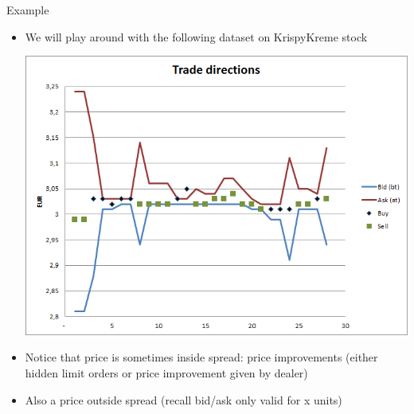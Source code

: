 \documentclass[english,10pt
,aspectratio=169
]{beamer}
\begin{document}
\begin{frame}{Example}
	\begin{itemize}
		\item We will play around with the following dataset on KrispyKreme stock
		\begin{center}
			\includegraphics[scale=0.34]{pics/L2_directions}
		\end{center}
		\pause
		\item Notice that price is sometimes inside spread: price improvements (either hidden limit orders or price improvement given by dealer)
		\item Also a price outside spread (recall bid/ask only valid for x units)
	\end{itemize}
\end{frame}


\end{document}

